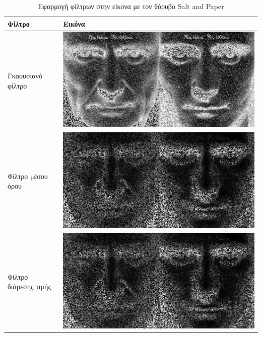 \begin{table}[H]
  \centering
  \begin{tabular}{| p{8cm} | p{8cm}|}
    \hline
    \textbf{Φίλτρο} & \textbf{Εικόνα} \\
    \hline
    Γκαουσιανό φίλτρο &
    \includegraphics[width=\linewidth]{Figures/sp_gauss_sharp} \\
    \hline
    Φίλτρο μέσου όρου &
    \includegraphics[width=\linewidth]{Figures/sp_average_sharp} \\
    \hline
    Φίλτρο διάμεσης τιμής &
    \includegraphics[width=\linewidth]{Figures/sp_median_blur} \\
    \hline
  \end{tabular}
  \caption{Εφαρμογή φίλτρων στην είκονα με τον θόρυβο Salt and Paper}
  \label{tab:sp}
\end{table}

